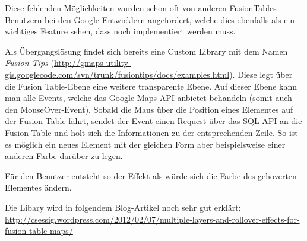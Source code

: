 Diese fehlenden Möglichkeiten wurden schon oft von anderen FusionTables-Benutzern bei den Google-Entwicklern angefordert, welche dies ebenfalls als ein wichtiges Feature sehen, dass noch implementiert werden muss.

Als Übergangslösung findet sich bereits eine Custom Library mit dem Namen \emph{Fusion Tips} (\url{http://gmaps-utility-gis.googlecode.com/svn/trunk/fusiontips/docs/examples.html}). Diese legt über die Fusion Table-Ebene eine weitere transparente Ebene. Auf dieser Ebene kann man alle Events, welche das Google Maps API anbietet behandeln (somit auch den MouseOver-Event). Sobald die Maus über die Position eines Elementes auf der Fusion Table fährt, sendet der Event einen Request über das SQL API an die Fusion Table und holt sich die Informationen zu der entsprechenden Zeile. So ist es möglich ein neues Element mit der gleichen Form aber beispielsweise einer anderen Farbe darüber zu legen.

Für den Benutzer entsteht so der Effekt als würde sich die Farbe des gehoverten Elementes ändern.

Die Libary wird in folgendem Blog-Artikel noch sehr gut erklärt: \url{http://csessig.wordpress.com/2012/02/07/multiple-layers-and-rollover-effects-for-fusion-table-maps/}